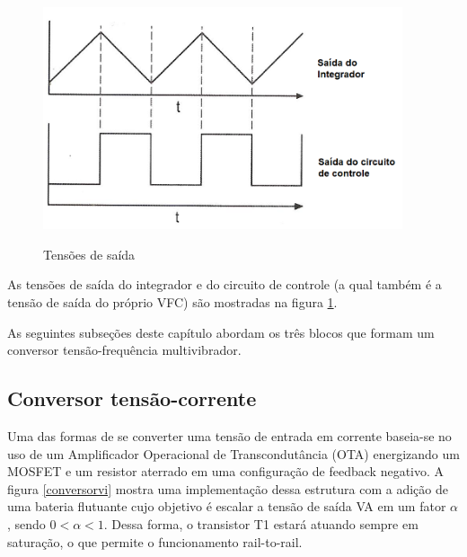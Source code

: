 \documentclass[
	12pt,				%
	oneside,			%
	a4paper,			%
	english,			%
	french,				%
	spanish,			%
	brazil				%
	]{abntex2}
\begin{document}
\begin{figure}[!ht]
  \centering
  \includegraphics[width=300pt]{VFCOndas.png}\\
  \caption{Tensões de saída}\label{VFCOndas}
\end{figure}

As tensões de saída do integrador e do circuito de controle (a qual também é a tensão de saída do próprio VFC) são mostradas na figura \ref{VFCOndas}.

As seguintes subseções deste capítulo abordam os três blocos que formam um conversor tensão-frequência multivibrador.

\subsection{Conversor tensão-corrente}

Uma das formas de se converter uma tensão de entrada em corrente baseia-se no uso de um Amplificador Operacional de Transcondutância (OTA) energizando um MOSFET e um resistor aterrado em uma configuração de feedback negativo. A figura \ref{conversorvi} mostra uma implementação dessa estrutura com a adição de uma bateria flutuante cujo objetivo é escalar a tensão de saída VA em um fator $\alpha$, sendo $0 < \alpha < 1$. Dessa forma, o transistor T1 estará atuando sempre em saturação, o que permite o funcionamento rail-to-rail.
\end{document}
